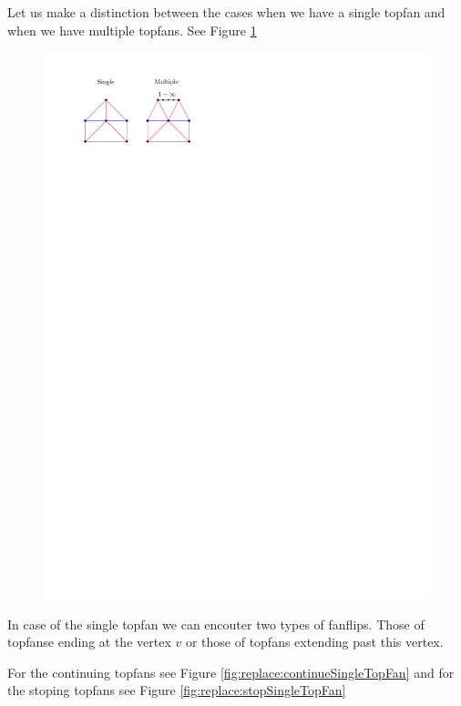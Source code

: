 Let us make a distinction between the cases when we have a single topfan and when we have multiple topfans. See Figure \ref{fig:replace:singleMultiTopFan}

\begin{figure}[h]
  \centering
  \includegraphics[scale=1]{chordReplace/img/singleMultiTopFan}
  \caption{}
  \label{fig:replace:singleMultiTopFan}
\end{figure}

In case of the single topfan we can encouter two types of fanflips. Those of topfanse ending at the vertex $v$ or those of topfans extending past this vertex.

For the continuing topfans see Figure \ref{fig:replace:continueSingleTopFan} and for the stoping topfans see Figure \ref{fig:replace:stopSingleTopFan}


